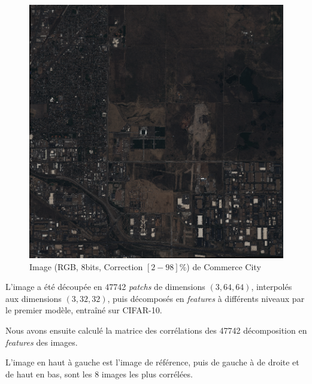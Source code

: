 \documentclass[a4paper, 11pt]{report}
\begin{document}
\begin{figure}[H]
	\begin{center}
		\includegraphics[scale=0.9]{Images/CommerceCity.png}
		\caption{Image (RGB, 8bits, Correction $[2-98]\%$) de Commerce City}
	\end{center}
\end{figure}

L'image a été découpée en 47742 \emph{patchs} de dimensions $(3, 64, 64)$, interpolés aux dimensions $(3, 32, 32)$, puis décomposés en \emph{features} à différents niveaux par le premier modèle, entraîné sur CIFAR-10.

Nous avons ensuite calculé la matrice des corrélations des 47742 décomposition en \emph{features} des images.

L'image en haut à gauche est l'image de référence, puis de gauche à de droite et de haut en bas, sont les 8 images les plus corrélées.
\end{document}
